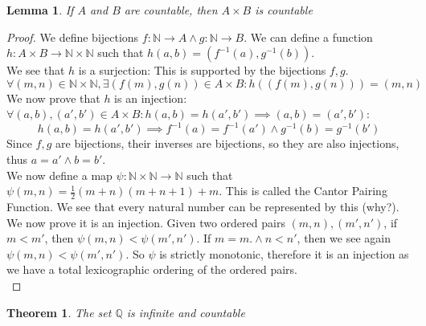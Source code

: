 \documentclass{article}
\newtheorem{thm}{Theorem}[section]
\newtheorem{lem}{Lemma}[section]
\begin{document}
\medskip
\begin{lem}
If $A$ and $B$ are countable, then $A \times B$ is countable
\end{lem}
\begin{proof}
We define bijections $f: \mathbb{N} \xrightarrow{} A \land g: \mathbb{N} \xrightarrow{} B$. We can define a function $h: A \times B \xrightarrow{} \mathbb{N} \times \mathbb{N}$ such that $h(a, b) = (f^{-1}(a), g^{-1}(b))$.\\

We see that $h$ is a surjection:  This is supported by the bijections $f, g$.
\begin{equation*}
    \forall (m, n) \in \mathbb{N} \times \mathbb{N}, \exists (f(m), g(n)) \in A \times B: h((f(m), g(n))) = (m, n)
\end{equation*}
We now prove that $h$ is an injection: $\forall (a, b), (a', b') \in A \times B: h(a, b) = h(a', b') \implies (a, b) = (a', b')$:
\begin{equation*}
    h(a, b) = h(a', b') \implies f^{-1}(a) = f^{-1}(a') \land g^{-1}(b) = g^{-1}(b')
\end{equation*}
Since $f, g$ are bijections, their inverses are bijections, so they are also injections, thus $a = a' \land b = b'$.\\

We now define a map $\psi: \mathbb{N} \times \mathbb{N} \xrightarrow{} \mathbb{N}$ such that $\psi(m, n) = \frac{1}{2}(m+n)(m+n+1) + m$. This is called the Cantor Pairing Function. We see that every natural number can be represented by this (why?).\\

We now prove it is an injection. Given two ordered pairs $(m, n), (m', n')$, if $m < m'$, then $\psi(m, n) < \psi(m', n')$. If $m = m. \land n < n'$, then we see again $\psi(m, n) < \psi(m', n')$. So $\psi$ is strictly monotonic, therefore it is an injection as we have a total lexicographic ordering of the ordered pairs.\\
\end{proof}
\medskip
\begin{thm}
The set $\mathbb{Q}$ is infinite and countable
\end{thm}
\end{document}
